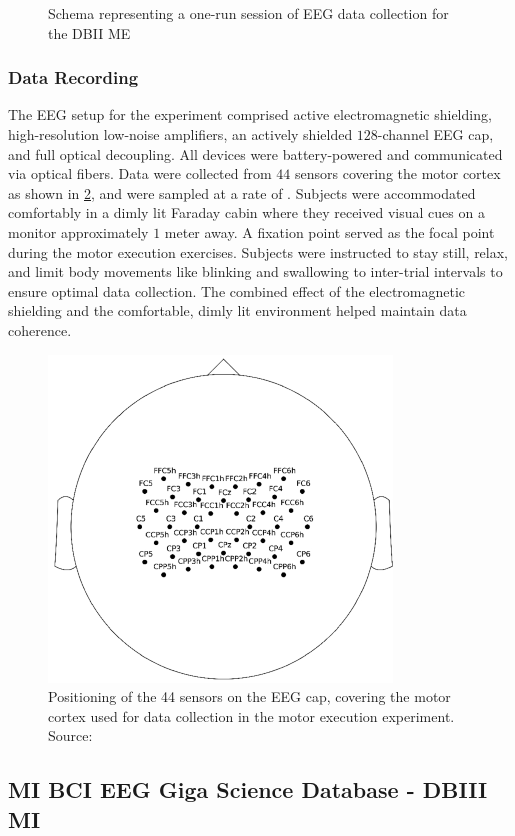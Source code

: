 \begin{figure}[h!]
\centering
    \resizebox{1.0\linewidth}{!}{}
    \caption{Schema representing a one-run session of EEG data collection for the DBII ME
    \label{fig:gamma_time}}
\end{figure}

\subsubsection{Data Recording}

The EEG setup for the experiment comprised active electromagnetic shielding, high-resolution low-noise amplifiers, an actively shielded $128$-channel EEG cap, and full optical decoupling. All devices were battery-powered and communicated via optical fibers. Data were collected from $44$ sensors covering the motor cortex as shown in \cref{fig:eeg_gamma}, and were sampled at a rate of . Subjects were accommodated comfortably in a dimly lit Faraday cabin where they received visual cues on a monitor approximately $1$ meter away. A fixation point served as the focal point during the motor execution exercises. Subjects were instructed to stay still, relax, and limit body movements like blinking and swallowing to inter-trial intervals to ensure optimal data collection. The combined effect of the electromagnetic shielding and the comfortable, dimly lit environment helped maintain data coherence.

\begin{figure}[h!]
\centering
    \includegraphics[width=0.4\linewidth]{Figures/preliminaries/gammaelectrodes.PNG}
    \caption{Positioning of the 44 sensors on the EEG cap, covering the motor cortex used for data collection in the motor execution experiment. Source: \cite{borra2019eeg} \label{fig:eeg_gamma}}
\end{figure}

\subsection{MI BCI EEG Giga Science Database - DBIII MI}


